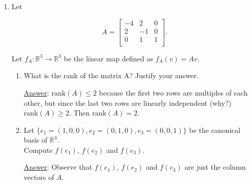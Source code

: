 \documentclass[]{book}
\theoremstyle{definition}
\newcommand{\bb}[1]{\mathbb{#1}}
\newcommand{\R}{\bb{R}}
\newcommand\ans{\underline{Answer}: }
\begin{document}
\begin{enumerate}
\begin{enumerate}
\[
(AB)_{ii} = \sum_{k=1}^n a_{ik}b_{ki} = a_{ii} b_{ii}
\]

since $a_{ik} = 0$ for $k < i$ and $b_{ki} = 0$ for $k > i$. Consequently, 
$\det(AB) = (a_{11}b_{11}) \cdot \ldots \cdot (a_{nn}b_{nn})$. Then it is clear that 

\[
\det(AB) = (a_{11} \cdot \ldots \cdot a_{nn}) (b_{11} \cdot \ldots \cdot b_{nn})=\det(A)\det(B).
\]

\item Recall that when $A$ is an invertible matrix, it satisfies $AA^{-1} = A^{-1}A = I$. 
Making use of the opening remark if necessary, reason why $\det(A^{-1}) = 1 / \det(A)$.

\ans Since $AA^{-1} = A^{-1}A = I$ by applying determinant we have $\det(AA^{-1}) = \det(A)\det(A^{-1}) = \det(\textrm{Id}_m) = 1$.
Making use of the last two equations we conclude that $\det(A^{-1}) = 1 / \det(A)$. Also there is no problem in dividing
by $\det(A)$ because any invertible matrix has non-zero determinant.

\end{enumerate}



\item Let

\[
   A=
  \left[ {\begin{array}{ccc}
   -4 & 2 & 0 \\
   2 & -1 & 0 \\
   0 & 1 & 1 \\
  \end{array} } \right].
\]

Let $f_A : \R^3 \to \R^3$ be the linear map defined as $f_A(v) = Av$.

\begin{enumerate}
\item What is the rank of the matrix A? Justify your answer.

\ans $\textrm{rank}(A) \leq 2$ because the first two rows are multiples of each other, but since the last 
two rows are linearly independent (why?) $\textrm{rank}(A) \geq 2$. Then $\textrm{rank}(A) = 2$.  

\item Let $\{e_1 = (1,0,0),e_2=(0,1,0),e_3=(0,0,1)\}$ be the canonical basis of $\R^3$.\\ 
            Compute $f(e_1)$, $f(e_2)$ and $f(e_3)$.

\ans Observe that $f(e_1)$, $f(e_2)$ and $f(e_3)$ are just the column vectors of $A$.


\end{enumerate}
\end{enumerate}
\end{document}
